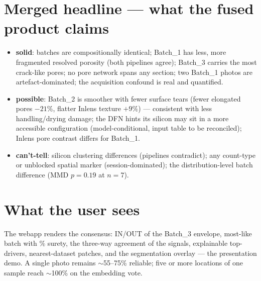 \documentclass[11pt]{article}
\begin{document}
\section{Merged headline --- what the fused product claims}
\begin{itemize}
\item \textbf{solid}: batches are compositionally identical; Batch\_1 has less,
more fragmented resolved porosity (both pipelines agree); Batch\_3 carries the
most crack-like pores; no pore network spans any section; two Batch\_1 photos are
artefact-dominated; the acquisition confound is real and quantified.
\item \textbf{possible}: Batch\_2 is smoother with fewer surface tears (fewer
elongated pores $-21\%$, flatter Inlens texture $+9\%$) --- consistent with less
handling/drying damage; the DFN hints its silicon may sit in a more accessible
configuration (model-conditional, input table to be reconciled); Inlens pore
contrast differs for Batch\_1.
\item \textbf{can't-tell}: silicon clustering differences (pipelines contradict);
any count-type or unblocked spatial marker (session-dominated); the
distribution-level batch difference (MMD $p=0.19$ at $n=7$).
\end{itemize}

\section*{What the user sees}
The webapp renders the consensus: IN/OUT of the Batch\_3 envelope, most-like
batch with \% surety, the three-way agreement of the signals, explainable
top-drivers, nearest-dataset patches, and the segmentation overlay --- the
presentation demo. A single photo remains $\sim$55--75\% reliable; five or more
locations of one sample reach $\sim$100\% on the embedding vote.
\end{document}
